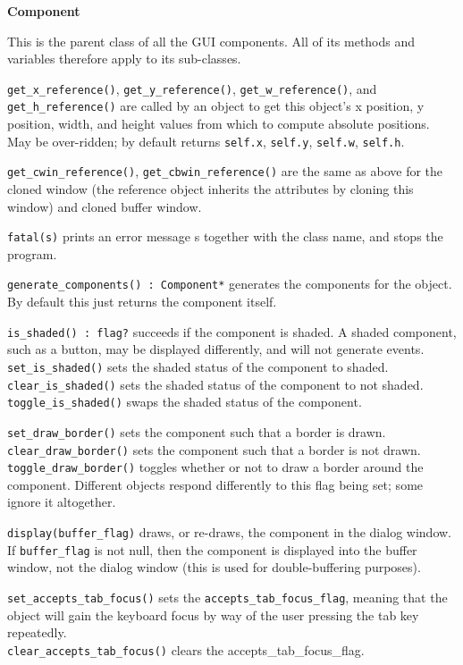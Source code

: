 {\ttfamily\bfseries
{}Component}

This is the parent class of all the GUI components. All of its methods
and variables therefore apply to its sub-classes.

\texttt{get\_x\_reference()}, \texttt{get\_y\_reference()},
\texttt{get\_w\_reference()}, and
\texttt{get\_h\_reference()} are called by an object to get this
object's x position, y position, width, and height
values from which to compute absolute positions. May be over-ridden;
by default returns \texttt{self.x}, \texttt{self.y}, \texttt{self.w},
\texttt{self.h}.

\texttt{get\_cwin\_reference()}, \texttt{get\_cbwin\_reference()} are
the same as above
for the cloned window (the reference object inherits the attributes by
cloning this window) and cloned buffer window.

\texttt{fatal(s)} prints an error message s together with the class name, and
stops the program.

\texttt{generate\_components() : Component*} generates the components for the
object. By default this just returns the component itself.

\texttt{is\_shaded() : flag?} succeeds if the component is shaded. A shaded
component, such as a button, may be displayed differently, and will not
generate events.\\
\texttt{set\_is\_shaded()} sets the shaded status of the component to
shaded.\\
\texttt{clear\_is\_shaded()} sets the shaded status of the component to not
shaded.\\
\texttt{toggle\_is\_shaded()} swaps the shaded status of the component.

\texttt{set\_draw\_border()} sets the component such that a border is
drawn.\\
\texttt{clear\_draw\_border()} sets the component such that a border is not
drawn.\\
\texttt{toggle\_draw\_border()} toggles whether or not to draw a border around
the component. Different objects respond differently to this flag being
set; some ignore it altogether.

\texttt{display(buffer\_flag)} draws, or re-draws, the component in the dialog
window. If \texttt{buffer\_flag} is not null, then the component is displayed
into the buffer window, not the dialog window (this is used for
double-buffering purposes).

\texttt{set\_accepts\_tab\_focus()} sets the
\texttt{accepts\_tab\_focus\_flag}, meaning
that the object will gain the keyboard focus by way of the user
pressing the tab key repeatedly.\\
\texttt{clear\_accepts\_tab\_focus()} clears the accepts\_tab\_focus\_flag.

